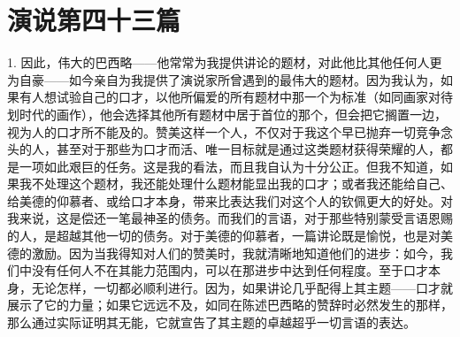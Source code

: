 
\section{演说第四十三篇}

\par

\par

1. 因此，伟大的巴西略——他常常为我提供讲论的题材，对此他比其他任何人更为自豪——如今亲自为我提供了演说家所曾遇到的最伟大的题材。因为我认为，如果有人想试验自己的口才，以他所偏爱的所有题材中那一个为标准（如同画家对待划时代的画作），他会选择其他所有题材中居于首位的那个，但会把它搁置一边，视为人的口才所不能及的。赞美这样一个人，不仅对于我这个早已抛弃一切竞争念头的人，甚至对于那些为口才而活、唯一目标就是通过这类题材获得荣耀的人，都是一项如此艰巨的任务。这是我的看法，而且我自认为十分公正。但我不知道，如果我不处理这个题材，我还能处理什么题材能显出我的口才；或者我还能给自己、给美德的仰慕者、或给口才本身，带来比表达我们对这个人的钦佩更大的好处。对我来说，这是偿还一笔最神圣的债务。而我们的言语，对于那些特别蒙受言语恩赐的人，是超越其他一切的债务。对于美德的仰慕者，一篇讲论既是愉悦，也是对美德的激励。因为当我得知对人们的赞美时，我就清晰地知道他们的进步：如今，我们中没有任何人不在其能力范围内，可以在那进步中达到任何程度。至于口才本身，无论怎样，一切都必顺利进行。因为，如果讲论几乎配得上其主题——口才就展示了它的力量；如果它远远不及，如同在陈述巴西略的赞辞时必然发生的那样，那么通过实际证明其无能，它就宣告了其主题的卓越超乎一切言语的表达。\par

